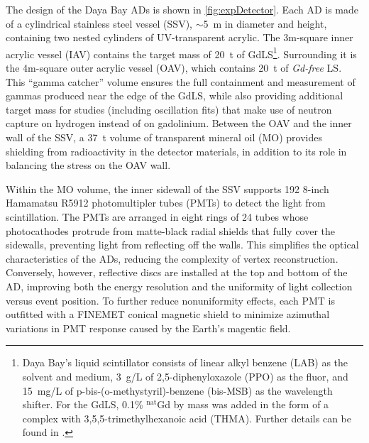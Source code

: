 \documentclass[../thesis.tex]{subfiles}
\begin{document}
The design of the Daya Bay ADs is shown in \autoref{fig:expDetector}. Each AD is made of a cylindrical stainless steel vessel (SSV), $\sim$5~m in diameter and height, containing two nested cylinders of UV-transparent acrylic. The 3m-square inner acrylic vessel (IAV) contains the target mass of 20~t of GdLS\footnote{Daya Bay's liquid scintillator consists of linear alkyl benzene (LAB) as the solvent and medium, 3~g/L of 2,5-diphenyloxazole (PPO) as the fluor, and 15~mg/L of p-bis-(o-methystyril)-benzene (bis-MSB) as the wavelength shifter. For the GdLS, 0.1\% $^{\text{nat}}$Gd by mass was added in the form of a complex with 3,5,5-trimethylhexanoic acid (THMA). Further details can be found in \cite{Beriguete_2014}.}. Surrounding it is the 4m-square outer acrylic vessel (OAV), which contains 20~t of \emph{Gd-free} LS. This ``gamma catcher'' volume ensures the full containment and measurement of gammas produced near the edge of the GdLS, while also providing additional target mass for studies (including oscillation  fits) that make use of neutron capture on hydrogen instead of on gadolinium. Between the OAV and the inner wall of the SSV, a 37~t volume of transparent mineral oil (MO) provides shielding from radioactivity in the detector materials, in addition to its role in balancing the stress on the OAV wall.

Within the MO volume, the inner sidewall of the SSV supports 192 8-inch Hamamatsu R5912 photomultipler tubes (PMTs) to detect the light from scintillation. The PMTs are arranged in eight rings of 24 tubes whose photocathodes protrude from matte-black radial shields that fully cover the sidewalls, preventing light from reflecting off the walls. This simplifies the optical characteristics of the ADs, reducing the complexity of vertex reconstruction. Conversely, however, reflective discs are installed at the top and bottom of the AD, improving both the energy resolution and the uniformity of light collection versus event position. To further reduce nonuniformity effects, each PMT is outfitted with a FINEMET conical magnetic shield to minimize azimuthal variations in PMT response caused by the Earth's magentic field.
\end{document}
